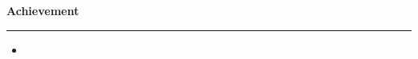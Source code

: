 \textbf{Achievement}
\par\noindent\rule{\textwidth}{0.2pt} %
\begin{itemize}
\item { {} \\ %
{} \hfill %
{} \\ %
{} } %
\end{itemize}
